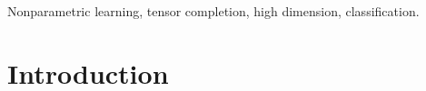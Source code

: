 \documentclass[useAMS,usenatbib,usegraphicx,referee]{biom}
\theoremstyle{plain}
\theoremstyle{definition}
\begin{document}
%

\begin{keywords}
 Nonparametric learning,  tensor completion, high dimension, classification.
 \end{keywords}


\maketitle


%
\section{Introduction}\label{sec:intro}
\end{document}
